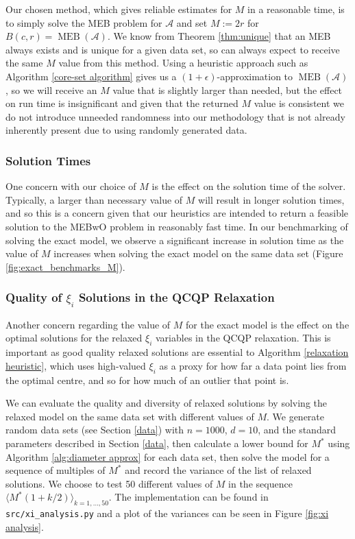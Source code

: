 \documentclass[11pt,twoside]{report}
\newcommand{\A}{\mathcal{A}} %
\DeclareMathOperator{\MEB}{MEB}
\theoremstyle{definition}
\numberwithin{theorem}{section}
\numberwithin{definition}{section}
\numberwithin{lemma}{section}
\numberwithin{proposition}{section}
\numberwithin{equation}{section}
\numberwithin{figure}{section}
\begin{document}
Our chosen method, which gives reliable estimates for $M$ in a reasonable time, is to simply solve the MEB problem for $\A$ and set $M:=2r$ for $B(c,r)=\MEB(\A)$. We know from Theorem \ref{thm:unique} that an MEB always exists and is unique for a given data set, so can always expect to receive the same $M$ value from this method. Using a heuristic approach such as Algorithm \ref{core-set algorithm} gives us a $(1+\epsilon)$-approximation to $\MEB(\A)$, so we will receive an $M$ value that is slightly larger than needed, but the effect on run time is insignificant and given that the returned $M$ value is consistent we do not introduce unneeded randomness into our methodology that is not already inherently present due to using randomly generated data.

\subsubsection{Solution Times}
One concern with our choice of $M$ is the effect on the solution time of the solver. Typically, a larger than necessary value of $M$ will result in longer solution times, and so this is a concern given that our heuristics are intended to return a feasible solution to the MEBwO problem in reasonably fast time. In our benchmarking of solving the exact model, we observe a significant increase in solution time as the value of $M$ increases when solving the exact model on the same data set (Figure \ref{fig:exact_benchmarks_M}). 

\subsubsection{Quality of $\xi_i$ Solutions in the QCQP Relaxation}
Another concern regarding the value of $M$ for the exact model is the effect on the optimal solutions for the relaxed $\xi_i$ variables in the QCQP relaxation. This is important as good quality relaxed solutions are essential to Algorithm \ref{relaxation heuristic}, which uses high-valued $\xi_i$ as a proxy for how far a data point lies from the optimal centre, and so for how much of an outlier that point is.

We can evaluate the quality and diversity of relaxed solutions by solving the relaxed model on the same data set with different values of $M$. We generate random data sets (see Section \ref{data}) with $n=1000$, $d=10$, and the standard parameters described in Section \ref{data}, then calculate a lower bound for $M^*$ using Algorithm \ref{alg:diameter approx} for each data set, then solve the model for a sequence of multiples of $M^*$ and record the variance of the list of relaxed solutions. We choose to test 50 different values of $M$ in the sequence $\langle M^*(1+k/2)\rangle _{k=1,\ldots,50}$. The implementation can be found in \texttt{src/xi\_analysis.py} and a plot of the variances can be seen in Figure \ref{fig:xi analysis}.
\end{document}

